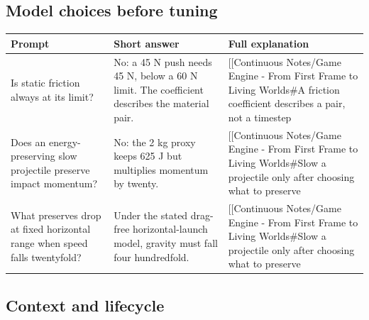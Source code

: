 \subsection{Model choices before tuning}\label{appendix-64ea716dcadc-model-choices-before-tuning}

{\def\LTcaptype{none} %
\begin{longtable}[]{@{}
  >{\raggedright\arraybackslash}p{}
  >{\raggedright\arraybackslash}p{}
  >{\raggedright\arraybackslash}p{}@{}}
\toprule\noalign{}
\begin{minipage}[b]{\linewidth}\raggedright
Prompt
\end{minipage} & \begin{minipage}[b]{\linewidth}\raggedright
Short answer
\end{minipage} & \begin{minipage}[b]{\linewidth}\raggedright
Full explanation
\end{minipage} \\
\midrule\noalign{}
\endhead
\bottomrule\noalign{}
\endlastfoot
Is static friction always at its limit? & No: a 45 N push needs 45 N, below a 60 N limit. The coefficient describes the material pair. & {[}{[}Continuous Notes/Game Engine - From First Frame to Living Worlds\#A friction coefficient describes a pair, not a timestep \\
Does an energy-preserving slow projectile preserve impact momentum? & No: the 2 kg proxy keeps 625 J but multiplies momentum by twenty. & {[}{[}Continuous Notes/Game Engine - From First Frame to Living Worlds\#Slow a projectile only after choosing what to preserve \\
What preserves drop at fixed horizontal range when speed falls twentyfold? & Under the stated drag-free horizontal-launch model, gravity must fall four hundredfold. & {[}{[}Continuous Notes/Game Engine - From First Frame to Living Worlds\#Slow a projectile only after choosing what to preserve \\
\end{longtable}
}

\subsection{Context and lifecycle}\label{appendix-64ea716dcadc-context-and-lifecycle}


